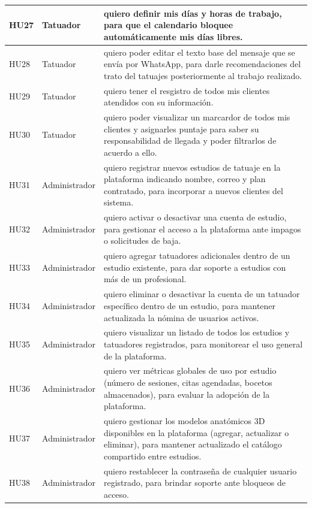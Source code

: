 \begin{longtable}{|l|p{3.5cm}|p{9.5cm}|}
  HU27 & Tatuador & quiero definir mis días y horas de trabajo, para que el calendario bloquee automáticamente mis días libres. \\ \hline
  HU28 & Tatuador & quiero poder editar el texto base del mensaje que se envía por WhatsApp, para darle recomendaciones del trato del tatuajes posteriormente al trabajo realizado. \\ \hline
  HU29 & Tatuador & quiero tener el resgistro de todos mis clientes atendidos con su información. \\ \hline
  HU30 & Tatuador & quiero poder visualizar un marcardor de todos mis clientes y asignarles puntaje para saber su responsabilidad de llegada y poder filtrarlos de acuerdo a ello. \\ \hline
  HU31 & Administrador & quiero registrar nuevos estudios de tatuaje en la plataforma indicando nombre, correo y plan contratado, para incorporar a nuevos clientes del sistema. \\ \hline
  HU32 & Administrador & quiero activar o desactivar una cuenta de estudio, para gestionar el acceso a la plataforma ante impagos o solicitudes de baja. \\ \hline
  HU33 & Administrador & quiero agregar tatuadores adicionales dentro de un estudio existente, para dar soporte a estudios con más de un profesional. \\ \hline
  HU34 & Administrador & quiero eliminar o desactivar la cuenta de un tatuador específico dentro de un estudio, para mantener actualizada la nómina de usuarios activos. \\ \hline
  HU35 & Administrador & quiero visualizar un listado de todos los estudios y tatuadores registrados, para monitorear el uso general de la plataforma. \\ \hline
  HU36 & Administrador & quiero ver métricas globales de uso por estudio (número de sesiones, citas agendadas, bocetos almacenados), para evaluar la adopción de la plataforma. \\ \hline
  HU37 & Administrador & quiero gestionar los modelos anatómicos 3D disponibles en la plataforma (agregar, actualizar o eliminar), para mantener actualizado el catálogo compartido entre estudios. \\ \hline
  HU38 & Administrador & quiero restablecer la contraseña de cualquier usuario registrado, para brindar soporte ante bloqueos de acceso. \\
\end{longtable}

